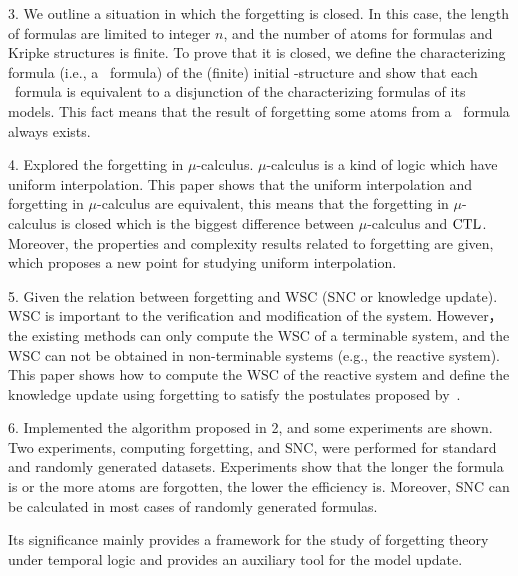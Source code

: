 \begin{englishabstract}
3. We outline a situation in which the forgetting is closed. In this case, the length of formulas are limited to integer $n$, and the number of atoms for formulas and Kripke structures is finite. To prove that it is closed, we define the characterizing formula (i.e., a \CTL\ formula) of the (finite) initial \MPK-structure and show that each \CTL\ formula is equivalent to a disjunction of the characterizing formulas of its models.  This fact means that the result of forgetting some atoms from a \CTL\ formula always exists. 

4. Explored the forgetting in $\mu$-calculus. $\mu$-calculus is a kind of logic which have uniform interpolation. This paper shows that the uniform interpolation and forgetting in $\mu$-calculus are equivalent, this means that the forgetting in $\mu$-calculus is closed which is the biggest difference between $\mu$-calculus and $\textrm{CTL}$. Moreover, the properties and complexity results related to forgetting are given, which proposes a new point for studying uniform interpolation.

5. Given the relation between forgetting and WSC (SNC or knowledge update). WSC is important to the verification and modification of the system. However， the existing methods can only compute the WSC of a terminable system, and the WSC can not be obtained in non-terminable systems (e.g., the reactive system). This paper shows how to compute the WSC of the reactive system and define the knowledge update using forgetting to satisfy the postulates proposed by~\citeauthor{katsuno91mendelzon}.

6. Implemented the algorithm proposed in 2, and some experiments are shown. Two experiments, computing forgetting, and SNC, were performed for standard and randomly generated datasets. Experiments show that the longer the formula is or the more atoms are forgotten, the lower the efficiency is. Moreover, SNC can be calculated in most cases of randomly generated formulas.

Its significance mainly provides a framework for the study of forgetting theory under temporal logic and provides an auxiliary tool for the model update.


\end{englishabstract}
